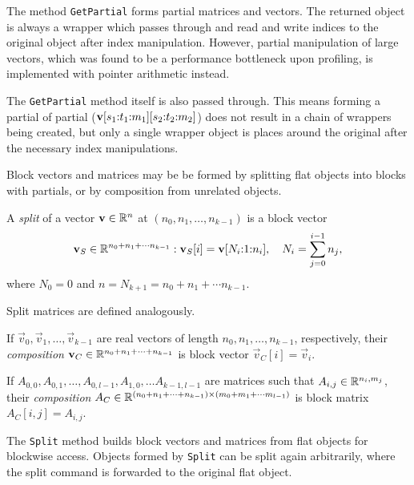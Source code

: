 The method \texttt{GetPartial} forms partial matrices and vectors. The
returned object is always a wrapper which passes through and read and
write indices to the original object after index
manipulation. However, partial manipulation of large vectors, which
was found to be a performance bottleneck upon profiling, is
implemented with pointer arithmetic instead.

The \texttt{GetPartial} method itself is also passed through. This
means forming a partial of partial
($\bm{\mathrm{v}}[s_1{:}t_1{:}m_1][s_2{:}t_2{:}m_2]$) does not
result in a chain of wrappers being created, but only a single wrapper
object is places around the original after the necessary index
manipulations.

Block vectors and matrices may be be formed by splitting flat objects
into blocks with partials, or by composition from unrelated objects.

\begin{dfn}
  A \emph{split} of a vector $\bm{\mathrm{v}} \in \mathbb{R}^n$ at $(n_0, n_1,
  \ldots, n_{k - 1})$ is a block vector
  \begin{equation}
    \label{eq:operations:ds:vector-split}
    \bm{\mathrm{v}}_S \in \mathbb{R}^{n_0 + n_1 + \cdots n_{k - 1}} : \bm{\mathrm{v}}_S[i]
    = \bm{\mathrm{v}}[N_i{:}1{:}n_i], \quad N_i = \sum_{j = 0}^{i - 1} n_j \text,
  \end{equation}
  where $N_0 = 0$ and $n = N_{k + 1} = n_0 + n_1 + \cdots n_{k - 1}$.
\end{dfn}
Split matrices are defined analogously.

\begin{dfn}
  \label{dfn:operations:ds:vector-compose}
  If $\vec{v}_0, \vec{v}_1, \ldots, \vec{v}_{k - 1}$ are real vectors
  of length $n_0, n_1, \ldots, n_{k - 1}$, respectively, their
  \emph{composition}
  $\bm{\mathrm{v}}_C \in \mathbb{R}^{n_0 + n_1 + \cdots + n_{k - 1}}$ is block
  vector $\vec{v}_C[i] = \vec{v}_i$.
\end{dfn}

\begin{dfn}
  \label{dfn:operations:ds:matrix-compose}
  If
  $A_{0, 0}, A_{0, 1}, \ldots, A_{0, l - 1}, A_{1, 0}, \ldots A_{k - 1,
    l - 1}$
  are matrices such that $A_{i, j} \in \mathbb{R}^{n_i, m_j}$, their
  \emph{composition}
  $A_C \in \mathbb{R}^{(n_0 + n_1 + \cdots + n_{k - 1}) \times (m_0 +
    m_1 + \cdots m_{l - 1})}$ is block
  matrix $A_C[i, j] = A_{i, j}$.
\end{dfn}

The \texttt{Split} method builds block vectors and matrices from flat
objects for blockwise access. Objects formed by \texttt{Split} can be
split again arbitrarily, where the split command is forwarded to the
original flat object.

